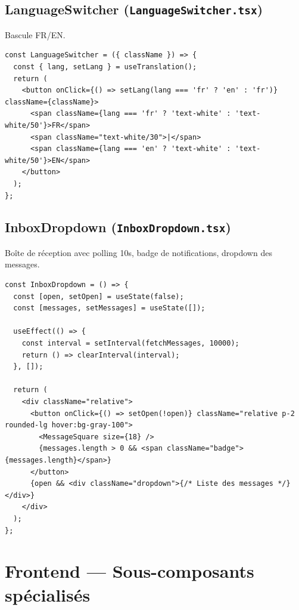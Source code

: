 \documentclass[12pt,a4paper]{article}
\begin{document}
\subsection{LanguageSwitcher (\texttt{LanguageSwitcher.tsx})}

Bascule FR/EN.

\begin{lstlisting}[style=code]
const LanguageSwitcher = ({ className }) => {
  const { lang, setLang } = useTranslation();
  return (
    <button onClick={() => setLang(lang === 'fr' ? 'en' : 'fr')} className={className}>
      <span className={lang === 'fr' ? 'text-white' : 'text-white/50'}>FR</span>
      <span className="text-white/30">|</span>
      <span className={lang === 'en' ? 'text-white' : 'text-white/50'}>EN</span>
    </button>
  );
};
\end{lstlisting}

\subsection{InboxDropdown (\texttt{InboxDropdown.tsx})}

Boîte de réception avec polling 10s, badge de notifications, dropdown des messages.

\begin{lstlisting}[style=code]
const InboxDropdown = () => {
  const [open, setOpen] = useState(false);
  const [messages, setMessages] = useState([]);

  useEffect(() => {
    const interval = setInterval(fetchMessages, 10000);
    return () => clearInterval(interval);
  }, []);

  return (
    <div className="relative">
      <button onClick={() => setOpen(!open)} className="relative p-2 rounded-lg hover:bg-gray-100">
        <MessageSquare size={18} />
        {messages.length > 0 && <span className="badge">{messages.length}</span>}
      </button>
      {open && <div className="dropdown">{/* Liste des messages */}</div>}
    </div>
  );
};
\end{lstlisting}

\newpage

\section{Frontend --- Sous-composants spécialisés}
\end{document}
